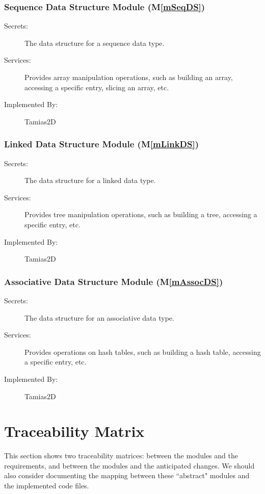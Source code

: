 \documentclass[12pt]{article}
\newcommand{\mref}[1]{M\ref{#1}}
\newcommand{\progname}{Tamias2D}
\begin{document}
\subsubsection{Sequence Data Structure Module (\mref{mSeqDS})}

\begin{description}
\item[Secrets:] The data structure for a sequence data type.
\item[Services:] Provides array manipulation operations, such as building an array, accessing a specific entry, slicing an array, etc.
\item[Implemented By:] {\progname}
\end{description}

\subsubsection{Linked Data Structure Module (\mref{mLinkDS})}

\begin{description}
\item[Secrets:] The data structure for a linked data type.
\item[Services:] Provides tree manipulation operations, such as building a tree, accessing a specific entry, etc.
\item[Implemented By:] {\progname}
\end{description}

\subsubsection{Associative Data Structure Module (\mref{mAssocDS})}

\begin{description}
\item[Secrets:] The data structure for an associative data type.
\item[Services:] Provides operations on hash tables, such as building a hash table, accessing a specific entry, etc.
\item[Implemented By:] {\progname}
\end{description}

\section{Traceability Matrix} \label{SecTM}

This section shows two traceability matrices: between the modules and the
requirements, and between the modules and the anticipated changes. We should also consider documenting the mapping between these ``abstract" modules and the implemented code files.
\end{document}
